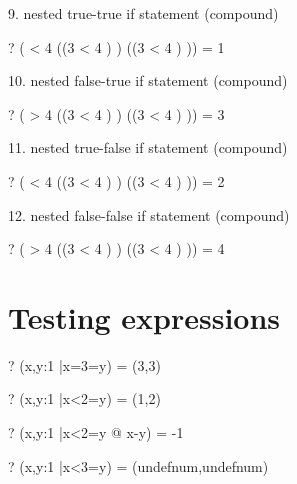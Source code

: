 \documentclass{article}
\newcommand{\negate}{-}
\begin{document}
 9. nested true-true if statement (compound)
\begin{zed} \vdash? ( < 4 \THEN (\IF (3 < 4  \in \nat)  ) \ELSE (\IF (3 < 4  \in \nat) )) = 1 \end{zed}
 10. nested false-true if statement (compound)
\begin{zed} \vdash? ( > 4 \THEN (\IF (3 < 4  \in \nat)  ) \ELSE (\IF (3 < 4  \in \nat) )) = 3 \end{zed}
 11. nested true-false if statement (compound)
\begin{zed} \vdash? ( < 4 \THEN (\IF (3 < 4  \notin \nat)  ) \ELSE (\IF (3 < 4  \in \nat) )) = 2 \end{zed}
 12. nested false-false if statement (compound)
\begin{zed} \vdash? ( > 4 \THEN (\IF (3 < 4  \in \nat)  ) \ELSE (\IF (3 < 4  \notin \nat) )) = 4 \end{zed}


\section{Testing \mu expressions}
\begin{zed} \vdash?  (\mu x,y:1 |x=3=y) = (3,3) \end{zed}
\begin{zed} \vdash?  (\mu x,y:1 |x<2=y) = (1,2) \end{zed}
\begin{zed} \vdash?  (\mu x,y:1 |x<2=y @ x-y) = \negate 1 \end{zed}
\begin{zed} \vdash?  (\mu x,y:1 |x<3=y) = (undefnum,undefnum) \end{zed}
\end{document}
